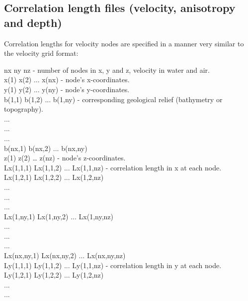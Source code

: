 \documentclass[twoside,final,onecolumn]{article}
\begin{document}
\subsection{Correlation length files (velocity, anisotropy and depth)}
Correlation lengths for velocity nodes are specified in a manner very similar to the velocity grid format:
\begin{framed}
\noindent nx ny nz \qquad\qquad\qquad- number of nodes in x, y and z, velocity in water and air.\\
x(1) x(2) ... x(nx) \qquad\qquad- node’s x-coordinates.\\
y(1) y(2) ... y(ny) \qquad\qquad- node's y-coordinates.\\
b(1,1) b(1,2) ... b(1,ny) \qquad\qquad- corresponding geological relief (bathymetry or topography).\\
.\hphantom{b(1,1)---}.\hphantom{b(1,2)------}.\\
.\hphantom{b(1,1)---}.\hphantom{b(1,2)------}.\\
.\hphantom{b(1,1)---}.\hphantom{b(1,2)------}.\\
b(nx,1) b(nx,2) ... b(nx,ny)\\
z(1) z(2) … z(nz) \qquad\qquad\qquad- node’s z-coordinates.\\
Lx(1,1,1) Lx(1,1,2) ... Lx(1,1,nz) \qquad\qquad- correlation length in x at each node.\\
Lx(1,2,1) Lx(1,2,2) ... Lx(1,2,nz)\\
.\hphantom{Lx(1,2,1)---}.\hphantom{Lx(1,2,2)------}.\\
.\hphantom{Lx(1,2,1)---}.\hphantom{Lx(1,2,2)------}.\\
.\hphantom{Lx(1,2,1)---}.\hphantom{Lx(1,2,2)------}.\\
Lx(1,ny,1) Lx(1,ny,2) ... Lx(1,ny,nz)\\
.\hphantom{Lx(1,ny,1)---}.\hphantom{Lx(1,ny,nz)----}.\\
.\hphantom{Lx(1,ny,1)---}.\hphantom{Lx(1,ny,nz)----}.\\
.\hphantom{Lx(1,ny,1)---}.\hphantom{Lx(1,ny,nz)----}.\\
Lx(nx,ny,1) Lx(nx,ny,2) ... Lx(nx,ny,nz)\\
Ly(1,1,1) Ly(1,1,2) ... Ly(1,1,nz) \qquad\qquad- correlation length in y at each node.\\
Ly(1,2,1) Ly(1,2,2) ... Ly(1,2,nz)\\
.\hphantom{Lx(1,2,1)---}.\hphantom{Lx(1,2,2)------}.\\
.\hphantom{Lx(1,2,1)---}.\hphantom{Lx(1,2,2)------}.\\

\end{framed}
\end{document}
